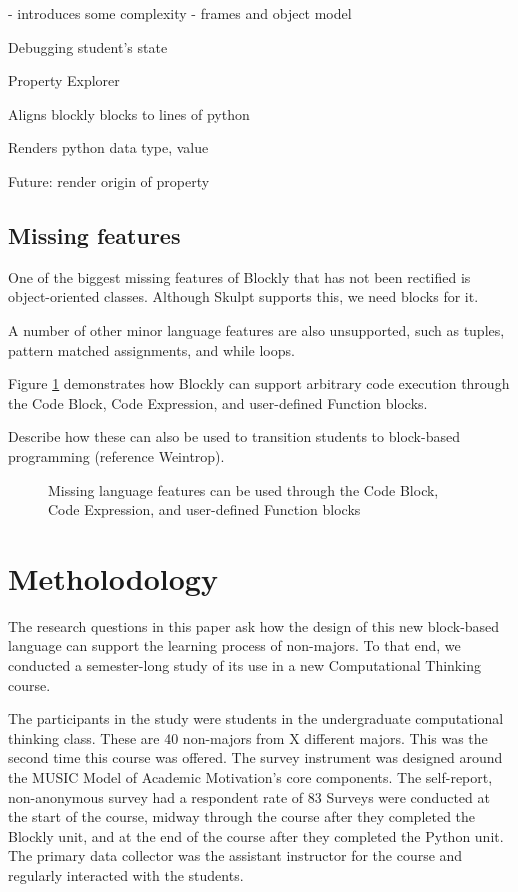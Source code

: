\documentclass{sig-alternate}
\begin{document}
- introduces some complexity - frames and object model

Debugging student's state

Property Explorer

	Aligns blockly blocks to lines of python
	
	Renders python data type, value
	
	Future: render origin of property


\subsection{Missing features}

One of the biggest missing features of Blockly that has not been rectified is object-oriented classes. Although Skulpt supports this, we need blocks for it.

A number of other minor language features are also unsupported, such as tuples, pattern matched assignments, and while loops.

Figure \ref{fig-blockly-custom} demonstrates how Blockly can support arbitrary code execution through the Code Block, Code Expression, and user-defined Function blocks.

Describe how these can also be used to transition students to block-based programming (reference Weintrop).

\begin{figure}
\label{fig-blockly-custom}
\caption{Missing language features can be used through the Code Block, Code Expression, and user-defined Function blocks}
\end{figure}


\section{Metholodology}

The research questions in this paper ask how the design of this new block-based language can support the learning process of non-majors. To that end, we conducted a semester-long study of its use in a new Computational Thinking course.

The participants in the study were students in the undergraduate computational thinking class. These are 40 non-majors from X different majors. This was the second time this course was offered. 
The survey instrument was designed around the MUSIC Model of Academic Motivation's core components. 
The self-report, non-anonymous survey had a respondent rate of 83%
Surveys were conducted at the start of the course, midway through the course after they completed the Blockly unit, and at the end of the course after they completed the Python unit.
The primary data collector was the assistant instructor for the course and regularly interacted with the students. 
\end{document}
